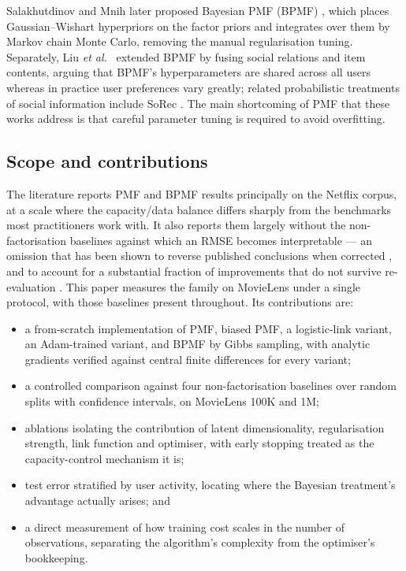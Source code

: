 \documentclass[conference]{IEEEtran}
\begin{document}
Salakhutdinov and Mnih later proposed Bayesian PMF (BPMF) \cite{salakhutdinov2008bayesian},
which places Gaussian--Wishart hyperpriors on the factor priors and integrates over them by
Markov chain Monte Carlo, removing the manual regularisation tuning. Separately, Liu
\emph{et al.}\ \cite{liu2013bayesian} extended BPMF by fusing social relations and item
contents, arguing that BPMF's hyperparameters are shared across all users whereas in
practice user preferences vary greatly; related probabilistic treatments of social
information include SoRec \cite{ma2008sorec}. The main shortcoming of PMF that these works
address is that careful parameter tuning is required to avoid overfitting.

\subsection{Scope and contributions}

The literature reports PMF and BPMF results principally on the Netflix corpus, at a scale
where the capacity/data balance differs sharply from the benchmarks most practitioners
work with. It also reports them largely without the non-factorisation baselines against
which an RMSE becomes interpretable --- an omission that has been shown to reverse
published conclusions when corrected \cite{rendle2019difficulty}, and to account for a
substantial fraction of improvements that do not survive re-evaluation
\cite{dacrema2019worrying}. This paper measures the family on MovieLens under a single
protocol, with those baselines present throughout. Its contributions are:

\begin{itemize}
  \item a from-scratch implementation of PMF, biased PMF, a logistic-link variant, an
        Adam-trained variant, and BPMF by Gibbs sampling, with analytic gradients verified
        against central finite differences for every variant;
  \item a controlled comparison against four non-factorisation baselines over \NumSeeds{}
        random splits with confidence intervals, on MovieLens 100K and 1M;
  \item ablations isolating the contribution of latent dimensionality, regularisation
        strength, link function and optimiser, with early stopping treated as the
        capacity-control mechanism it is;
  \item test error stratified by user activity, locating where the Bayesian treatment's
        advantage actually arises; and
  \item a direct measurement of how training cost scales in the number of observations,
        separating the algorithm's complexity from the optimiser's bookkeeping.
\end{itemize}
\end{document}
